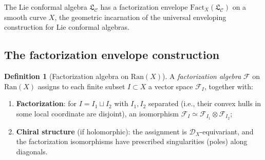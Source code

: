 \documentclass[11pt]{article}
\theoremstyle{plain}
\theoremstyle{definition}
\newtheorem{definition}[theorem]{Definition}
\theoremstyle{remark}
\newcommand{\Ran}{\mathrm{Ran}}
\newcommand{\Fact}{\mathrm{Fact}}
\newcommand{\cC}{\mathcal{C}}
\newcommand{\cD}{\mathcal{D}}
\newcommand{\cF}{\mathcal{F}}
\newcommand{\frakL}{\mathfrak{L}}
\begin{document}
The Lie conformal algebra $\frakL_\cC$ has a factorization envelope
$\Fact_X(\frakL_\cC)$ on a smooth curve $X$, the geometric incarnation
of the universal enveloping construction for Lie conformal algebras.

\subsection{The factorization envelope construction}
\label{sec:fact-envelope}

\begin{definition}[Factorization algebra on $\Ran(X)$]
\label{def:fact-alg}
A \emph{factorization algebra} $\cF$ on $\Ran(X)$ assigns to each finite subset $I \subset X$ a vector space $\cF_I$, together with:
\begin{enumerate}[label=(\roman*)]
\item \textbf{Factorization}: for $I = I_1 \sqcup I_2$ with $I_1, I_2$ separated (i.e., their convex hulls in some local coordinate are disjoint), an isomorphism $\cF_I \simeq \cF_{I_1} \otimes \cF_{I_2}$;
\item \textbf{Chiral structure} (if holomorphic): the assignment is $\cD_X$-equivariant, and the factorization isomorphisms have prescribed singularities (poles) along diagonals.
\end{enumerate}
\end{definition}
\end{document}
